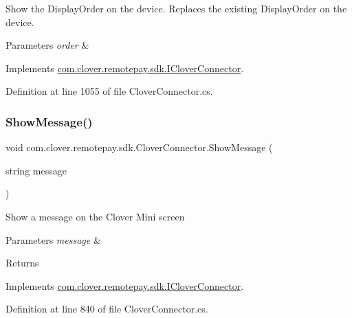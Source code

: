Show the Display\+Order on the device. Replaces the existing Display\+Order on the device. 


\begin{DoxyParams}{Parameters}
{\em order} & \\
\hline
\end{DoxyParams}


Implements \hyperlink{interfacecom_1_1clover_1_1remotepay_1_1sdk_1_1_i_clover_connector_a50be4c513f6f67971b51f6f76f30ac06}{com.\+clover.\+remotepay.\+sdk.\+I\+Clover\+Connector}.



Definition at line 1055 of file Clover\+Connector.\+cs.

\mbox{\label{classcom_1_1clover_1_1remotepay_1_1sdk_1_1_clover_connector_a6efd4dc87eaf16f949b9aeb93e7af464}} 
\subsubsection{\texorpdfstring{Show\+Message()}{ShowMessage()}}
{\footnotesize\ttfamily void com.\+clover.\+remotepay.\+sdk.\+Clover\+Connector.\+Show\+Message (\begin{DoxyParamCaption}\item[{string}]{message }\end{DoxyParamCaption})}



Show a message on the Clover Mini screen 


\begin{DoxyParams}{Parameters}
{\em message} & \\
\hline
\end{DoxyParams}
\begin{DoxyReturn}{Returns}

\end{DoxyReturn}


Implements \hyperlink{interfacecom_1_1clover_1_1remotepay_1_1sdk_1_1_i_clover_connector_a2d4c2a87f772459bb1a494e2f87835a8}{com.\+clover.\+remotepay.\+sdk.\+I\+Clover\+Connector}.



Definition at line 840 of file Clover\+Connector.\+cs.

